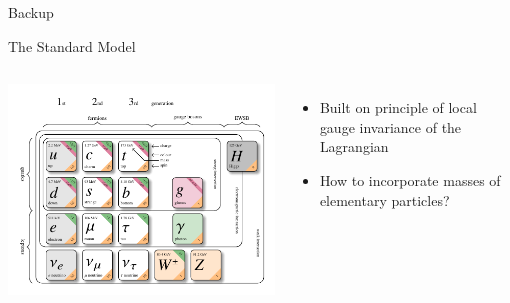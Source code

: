 \documentclass[11pt, xcolor={dvipsnames}, aspectratio=169, notes]{beamer}
\begin{document}

\begin{frame}[standout]
  Backup
\end{frame}


\begin{frame}{The Standard Model}
  \begin{columns}
    \centering

    \vspace*{1em}

    \includegraphics[width=\textwidth, trim=0.9cm 0.3cm 0.2cm 1.5cm,
    clip]{theory/sm}


    \begin{itemize}
      \setlength{\itemsep}{1.5em}
    \item Built on principle of local gauge invariance of the Lagrangian
    \item How to incorporate masses of elementary particles?
    \end{itemize}
  \end{columns}



\end{frame}
\end{document}
